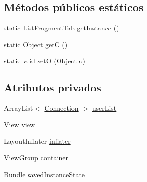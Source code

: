 \subsection*{Métodos públicos estáticos}
\begin{DoxyCompactItemize}
\item 
static \hyperlink{classes_1_1ucm_1_1tfg_1_1controlremotolinux_1_1client_1_1controller_1_1ListFragmentTab}{List\-Fragment\-Tab} \hyperlink{classes_1_1ucm_1_1tfg_1_1controlremotolinux_1_1client_1_1controller_1_1ListFragmentTab_a9f9d6bfee783afd5e081520223d3d210}{get\-Instance} ()
\item 
static Object \hyperlink{classes_1_1ucm_1_1tfg_1_1controlremotolinux_1_1client_1_1controller_1_1ListFragmentTab_aaa42a99f4a577f196fa9b8930a1aed99}{get\-O} ()
\item 
static void \hyperlink{classes_1_1ucm_1_1tfg_1_1controlremotolinux_1_1client_1_1controller_1_1ListFragmentTab_a4f429ae685bc7998e84f3241b3f332f0}{set\-O} (Object \hyperlink{classes_1_1ucm_1_1tfg_1_1controlremotolinux_1_1client_1_1controller_1_1ListFragmentTab_a0e1ccfc5f6d71ad1d59df4b6ff57efef}{o})
\end{DoxyCompactItemize}
\subsection*{Atributos privados}
\begin{DoxyCompactItemize}
\item 
Array\-List$<$ \hyperlink{classes_1_1ucm_1_1tfg_1_1controlremotolinux_1_1client_1_1model_1_1sql_1_1Connection}{Connection} $>$ \hyperlink{classes_1_1ucm_1_1tfg_1_1controlremotolinux_1_1client_1_1controller_1_1ListFragmentTab_a75469695cff3b7dfc7ce5acd2b20f5d2}{user\-List}
\item 
View \hyperlink{classes_1_1ucm_1_1tfg_1_1controlremotolinux_1_1client_1_1controller_1_1ListFragmentTab_a5f74d138ac1ed74151d7d7bc926520c7}{view}
\item 
Layout\-Inflater \hyperlink{classes_1_1ucm_1_1tfg_1_1controlremotolinux_1_1client_1_1controller_1_1ListFragmentTab_aa372f69bd7e7da9ef5e3bffdebcf78ed}{inflater}
\item 
View\-Group \hyperlink{classes_1_1ucm_1_1tfg_1_1controlremotolinux_1_1client_1_1controller_1_1ListFragmentTab_a147ddae2b70e8a0de2bda68af01a002c}{container}
\item 
Bundle \hyperlink{classes_1_1ucm_1_1tfg_1_1controlremotolinux_1_1client_1_1controller_1_1ListFragmentTab_a236516cfdd7813ca1c9e279b1b08a0ab}{saved\-Instance\-State}
\end{DoxyCompactItemize}
